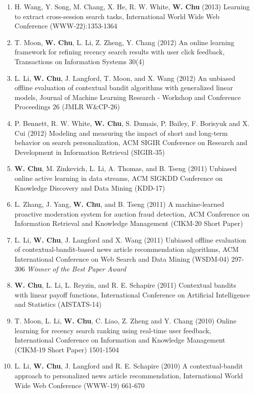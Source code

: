 \documentclass[line,10pt,final]{res}
\begin{document}
\begin{resume}
\begin{enumerate}
\item H. Wang, Y. Song, M. Chang, X. He, R. W. White,  {\bf W. Chu} (2013) Learning to extract cross-session search tasks, International World Wide Web Conference (WWW-22):1353-1364  
\item T. Moon,  {\bf W. Chu}, L. Li, Z. Zheng, Y. Chang (2012) An online learning framework for refining recency search results with user click feedback, Transactions on Information Systems 30(4)  
\item L. Li,  {\bf W. Chu}, J. Langford, T. Moon, and X. Wang (2012) An unbiased offline evaluation of contextual bandit algorithms with generalized linear models, Journal of Machine Learning Research - Workshop and Conference Proceedings 26 (JMLR W\&CP-26)  
\item P. Bennett, R. W. White,  {\bf W. Chu}, S. Dumais, P. Bailey, F. Borisyuk and X. Cui (2012) Modeling and measuring the impact of short and long-term behavior on search personalization, ACM SIGIR Conference on Research and Development in Information Retrieval (SIGIR-35)  
\item  {\bf W. Chu}, M. Zinkevich, L. Li, A. Thomas, and B. Tseng (2011) Unbiased online active learning in data streams, ACM SIGKDD Conference on Knowledge Discovery and Data Mining (KDD-17)  
\item L. Zhang, J. Yang,  {\bf W. Chu}, and B. Tseng (2011) A machine-learned proactive moderation system for auction fraud detection, ACM Conference on Information Retrieval and Knowledge Management (CIKM-20 Short Paper)  
\item L. Li,  {\bf W. Chu}, J. Langford and X. Wang (2011) Unbiased offline evaluation of contextual-bandit-based news article recommendation algorithms, ACM International Conference on Web Search and Data Mining (WSDM-04) 297-306   {\em Winner of the Best Paper Award}
\item  {\bf W. Chu}, L. Li, L. Reyzin, and R. E. Schapire (2011) Contextual bandits with linear payoff functions, International Conference on Artificial Intelligence and Statistics (AISTATS-14)  
\item T. Moon, L. Li,  {\bf W. Chu}, C. Liao, Z. Zheng and Y. Chang (2010) Online learning for recency search ranking using real-time user feedback, International Conference on Information and Knowledge Management (CIKM-19 Short Paper) 1501-1504  
\item L. Li,  {\bf W. Chu}, J. Langford and R. E. Schapire (2010) A contextual-bandit approach to personalized news article recommendation, International World Wide Web Conference (WWW-19) 661-670  

\end{enumerate}
\end{resume}
\end{document}
